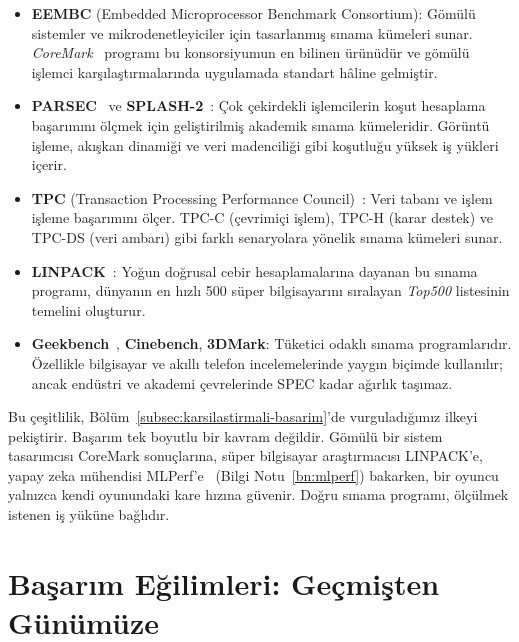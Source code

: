 \begin{itemize}
    \item \textbf{EEMBC} (Embedded Microprocessor Benchmark Consortium): Gömülü sistemler ve mikrodenetleyiciler için tasarlanmış sınama kümeleri sunar. \emph{CoreMark}~\cite{galon2012} programı bu konsorsiyumun en bilinen ürünüdür ve gömülü işlemci karşılaştırmalarında uygulamada standart hâline gelmiştir.
    \item \textbf{PARSEC}~\cite{bienia2008} ve \textbf{SPLASH-2}~\cite{woo1995}: Çok çekirdekli işlemcilerin koşut hesaplama başarımını ölçmek için geliştirilmiş akademik sınama kümeleridir. Görüntü işleme, akışkan dinamiği ve veri madenciliği gibi koşutluğu yüksek iş yükleri içerir.
    \item \textbf{TPC} (Transaction Processing Performance Council)~\cite{tpc}: Veri tabanı ve işlem işleme başarımını ölçer. TPC-C (çevrimiçi işlem), TPC-H (karar destek) ve TPC-DS (veri ambarı) gibi farklı senaryolara yönelik sınama kümeleri sunar.
    \item \textbf{LINPACK}~\cite{dongarra2003}: Yoğun doğrusal cebir hesaplamalarına dayanan bu sınama programı, dünyanın en hızlı 500 süper bilgisayarını sıralayan \emph{Top500} listesinin temelini oluşturur.
    \item \textbf{Geekbench}~\cite{geekbench}, \textbf{Cinebench}, \textbf{3DMark}: Tüketici odaklı sınama programlarıdır. Özellikle bilgisayar ve akıllı telefon incelemelerinde yaygın biçimde kullanılır; ancak endüstri ve akademi çevrelerinde SPEC kadar ağırlık taşımaz.
\end{itemize}

Bu çeşitlilik, Bölüm~\ref{subsec:karsilastirmali-basarim}'de vurguladığımız ilkeyi pekiştirir. Başarım tek boyutlu bir kavram değildir. Gömülü bir sistem tasarımcısı CoreMark sonuçlarına, süper bilgisayar araştırmacısı LINPACK'e, yapay zeka mühendisi MLPerf'e~\cite{mattson2020} (Bilgi Notu~\ref{bn:mlperf}) bakarken, bir oyuncu yalnızca kendi oyunundaki kare hızına güvenir. Doğru sınama programı, ölçülmek istenen iş yüküne bağlıdır.

\section{Başarım Eğilimleri: Geçmişten Günümüze}
\label{sec:basarim-egilimleri}

